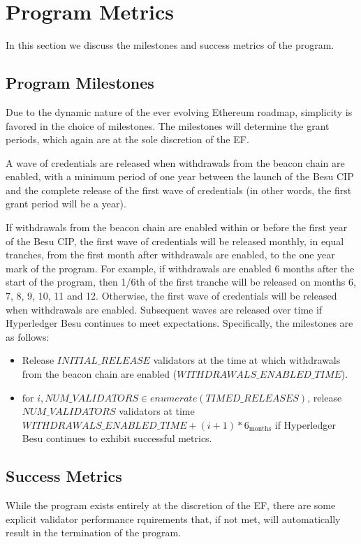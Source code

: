 
\section{Program Metrics} \label{sec:metrics}
In this section we discuss the milestones and success metrics of the program.

\subsection{Program Milestones}
Due to the dynamic nature of the ever evolving Ethereum roadmap, simplicity is favored in the choice of milestones.  The milestones will determine the grant periods, which again are at the sole discretion of the EF.

A wave of credentials are released when withdrawals from the beacon chain are enabled, with a minimum period of one year between the launch of the Besu CIP and the complete release of the first wave of credentials (in other words, the first grant period will be a year).

If withdrawals from the beacon chain are enabled within or before the first year of the Besu CIP, the first wave of credentials will be released monthly, in equal tranches, from the first month after withdrawals are enabled, to the one year mark of the program. For example, if withdrawals are enabled 6 months after the start of the program, then 1/6th of the first tranche will be released on months 6, 7, 8, 9, 10, 11 and 12. Otherwise, the first wave of credentials will be released when withdrawals are enabled. Subsequent waves are released over time if Hyperledger Besu continues to meet expectations. Specifically, the milestones are as follows:

\begin{itemize}
\item Release $INITIAL\_RELEASE$ validators at the time at which withdrawals from the beacon chain are enabled ($WITHDRAWALS\_ENABLED\_TIME$).
\item $\text{for } i, NUM\_VALIDATORS \in enumerate \left(TIMED\_RELEASES \right)$, release $NUM\_VALIDATORS$ validators at time $WITHDRAWALS\_ENABLED\_TIME + (i + 1) * 6_{\text{months}}$ if Hyperledger Besu continues to exhibit successful metrics.
\end{itemize}

\subsection{Success Metrics}
While the program exists entirely at the discretion of the EF, there are some explicit validator performance rquirements that, if not met, will automatically result in the termination of the program.

